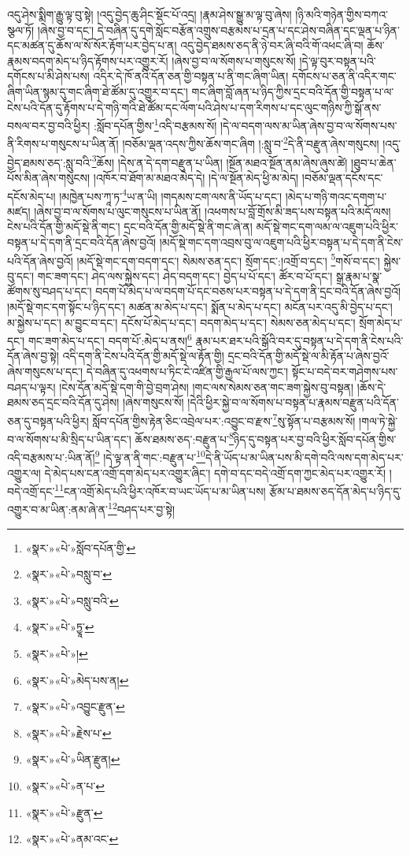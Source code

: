 འདུ་ཤེས་སྨིག་རྒྱུ་ལྟ་བུ་སྟེ། །འདུ་བྱེད་ཆུ་ཤིང་སྡོང་པོ་འདྲ། །རྣམ་ཤེས་སྒྱུ་མ་ལྟ་བུ་ཞེས། །ཉི་མའི་གཉེན་གྱིས་བཀའ་སྩལ་ཏོ། །ཞེས་བྱ་བ་དང་། དེ་བཞིན་དུ་དགེ་སློང་བརྩོན་འགྲུས་བརྩམས་པ་དྲན་པ་དང་ཤེས་བཞིན་དང་ལྡན་པ་ཉིན་དང་མཚན་དུ་ཆོས་ལ་སོ་སོར་རྟོག་པར་བྱེད་པ་ན། འདུ་བྱེད་ཐམས་ཅད་ནི་ཉེ་བར་ཞི་བའི་གོ་འཕང་ཞི་བ། ཆོས་རྣམས་བདག་མེད་པ་ཉིད་རྟོགས་པར་འགྱུར་རོ། །ཞེས་བྱ་བ་ལ་སོགས་པ་གསུངས་སོ། །དེ་ལྟ་བུར་བསྟན་པའི་དགོངས་པ་མི་ཤེས་པས། འདིར་དེ་ཁོ་ནའི་དོན་ཅན་གྱི་བསྟན་པ་ནི་གང་ཞིག་ཡིན། དགོངས་པ་ཅན་ནི་འདིར་གང་ཞིག་ཡིན་སྙམ་དུ་གང་ཞིག་ཐེ་ཚོམ་དུ་འགྱུར་བ་དང་། གང་ཞིག་བློ་ཞན་པ་ཉིད་ཀྱིས་དྲང་བའི་དོན་གྱི་བསྟན་པ་ལ་ངེས་པའི་དོན་དུ་རྟོགས་པ་དེ་གཉི་གའི་ཐེ་ཚོམ་དང་ལོག་པའི་ཤེས་པ་དག་རིགས་པ་དང་ལུང་གཉིས་ཀྱི་སྒོ་ནས་བསལ་བར་བྱ་བའི་ཕྱིར། :སློབ་དཔོན་གྱིས་\footnote{«སྣར་»«པེ་»སློབ་དཔོན་གྱི་}འདི་བརྩམས་སོ། །དེ་ལ་བདག་ལས་མ་ཡིན་ཞེས་བྱ་བ་ལ་སོགས་པས་ནི་རིགས་པ་གསུངས་པ་ཡིན་ནོ། །བཅོམ་ལྡན་འདས་ཀྱིས་ཆོས་གང་ཞིག །:སླུ་བ་\footnote{«སྣར་»«པེ་»བསླུ་བ་}དེ་ནི་བརྫུན་ཞེས་གསུངས། །འདུ་བྱེད་ཐམས་ཅད་:སླུ་བའི་\footnote{«སྣར་»«པེ་»བསླུ་བའི་}ཆོས། །དེས་ན་དེ་དག་བརྫུན་པ་ཡིན། །སྔོན་མཐའ་སྔོན་ནམ་ཞེས་ཞུས་ཚེ། །ཐུབ་པ་ཆེན་པོས་མིན་ཞེས་གསུངས། །འཁོར་བ་ཐོག་མ་མཐའ་མེད་དེ། །དེ་ལ་སྔོན་མེད་ཕྱི་མ་མེད། །བཅོམ་ལྡན་དངོས་དང་དངོས་མེད་པ། །མཁྱེན་པས་ཀཱ་ཏ་\footnote{«སྣར་»«པེ་»ཏྱཱ་}ཡ་ན་ཡི། །གདམས་ངག་ལས་ནི་ཡོད་པ་དང་། །མེད་པ་གཉི་གའང་དགག་པ་མཛད། །ཞེས་བྱ་བ་ལ་སོགས་པ་ལུང་གསུངས་པ་ཡིན་ནོ། །འཕགས་པ་བློ་གྲོས་མི་ཟད་པས་བསྟན་པའི་མདོ་ལས། ངེས་པའི་དོན་གྱི་མདོ་སྡེ་ནི་གང་། དྲང་བའི་དོན་གྱི་མདོ་སྡེ་ནི་གང་ཞེ་ན། མདོ་སྡེ་གང་དག་ལམ་ལ་འཇུག་པའི་ཕྱིར་བསྟན་པ་དེ་དག་ནི་དྲང་བའི་དོན་ཞེས་བྱའོ། །མདོ་སྡེ་གང་དག་འབྲས་བུ་ལ་འཇུག་པའི་ཕྱིར་བསྟན་པ་དེ་དག་ནི་ངེས་པའི་དོན་ཞེས་བྱའོ། །མདོ་སྡེ་གང་དག་བདག་དང་། སེམས་ཅན་དང་། སྲོག་དང་:།འགྲོ་བ་དང་། \footnote{«སྣར་»«པེ་»། }གསོ་བ་དང་། སྐྱེས་བུ་དང་། གང་ཟག་དང་། ཤེད་ལས་སྐྱེས་དང་། ཤེད་བདག་དང་། བྱེད་པ་པོ་དང་། ཚོར་བ་པོ་དང་། སྒྲ་རྣམ་པ་སྣ་ཚོགས་སུ་བཤད་པ་དང་། བདག་པོ་མེད་པ་ལ་བདག་པོ་དང་བཅས་པར་བསྟན་པ་དེ་དག་ནི་དྲང་བའི་དོན་ཞེས་བྱའོ། །མདོ་སྡེ་གང་དག་སྟོང་པ་ཉིད་དང་། མཚན་མ་མེད་པ་དང་། སྨོན་པ་མེད་པ་དང་། མངོན་པར་འདུ་མི་བྱེད་པ་དང་། མ་སྐྱེས་པ་དང་། མ་བྱུང་བ་དང་། དངོས་པོ་མེད་པ་དང་། བདག་མེད་པ་དང་། སེམས་ཅན་མེད་པ་དང་། སྲོག་མེད་པ་དང་། གང་ཟག་མེད་པ་དང་། བདག་པོ་:མེད་པ་ནས།\footnote{«སྣར་»«པེ་»མེད་པས་ན།} རྣམ་པར་ཐར་པའི་སྒོའི་བར་དུ་བསྟན་པ་དེ་དག་ནི་ངེས་པའི་དོན་ཞེས་བྱ་སྟེ། འདི་དག་ནི་ངེས་པའི་དོན་གྱི་མདོ་སྡེ་ལ་རྟོན་གྱི། དྲང་བའི་དོན་གྱི་མདོ་སྡེ་ལ་མི་རྟོན་པ་ཞེས་བྱའོ་ཞེས་གསུངས་པ་དང་། དེ་བཞིན་དུ་འཕགས་པ་ཏིང་ངེ་འཛིན་གྱི་རྒྱལ་པོ་ལས་ཀྱང་། སྟོང་པ་བདེ་བར་གཤེགས་པས་བཤད་པ་ལྟར། །ངེས་དོན་མདོ་སྡེ་དག་གི་བྱེ་བྲག་ཤེས། །གང་ལས་སེམས་ཅན་གང་ཟག་སྐྱེས་བུ་བསྟན། །ཆོས་དེ་ཐམས་ཅད་དྲང་བའི་དོན་དུ་ཤེས། །ཞེས་གསུངས་སོ། །དེའི་ཕྱིར་སྐྱེ་བ་ལ་སོགས་པ་བསྟན་པ་རྣམས་བརྫུན་པའི་དོན་ཅན་དུ་བསྟན་པའི་ཕྱིར། སློབ་དཔོན་གྱིས་རྟེན་ཅིང་འབྲེལ་པར་:འབྱུང་བ་རྫས་\footnote{«སྣར་»«པེ་»འབྱུང་རྫུན་}སུ་སྟོན་པ་བརྩམས་སོ། །གལ་ཏེ་སྐྱེ་བ་ལ་སོགས་པ་མི་སྲིད་པ་ཡིན་དང་། ཆོས་ཐམས་ཅད་:བརྫུན་པ་\footnote{«སྣར་»«པེ་»རྗེས་པ་}ཉིད་དུ་བསྟན་པར་བྱ་བའི་ཕྱིར་སློབ་དཔོན་གྱིས་འདི་བརྩམས་པ་:ཡིན་ནོ།\footnote{«སྣར་»«པེ་»ཡིན་རྫུན།} །དེ་ལྟ་ན་ནི་གང་:བརྫུན་པ་\footnote{«སྣར་»«པེ་»ན་པ་}དེ་ནི་ཡོད་པ་མ་ཡིན་པས་མི་དགེ་བའི་ལས་དག་མེད་པར་འགྱུར་ལ། དེ་མེད་པས་ངན་འགྲོ་དག་མེད་པར་འགྱུར་ཞིང་། དགེ་བ་དང་བདེ་འགྲོ་དག་ཀྱང་མེད་པར་འགྱུར་རོ། །བདེ་འགྲོ་དང་\footnote{«སྣར་»«པེ་»རྫུན་}ངན་འགྲོ་མེད་པའི་ཕྱིར་འཁོར་བ་ཡང་ཡོད་པ་མ་ཡིན་པས། རྩོམ་པ་ཐམས་ཅད་དོན་མེད་པ་ཉིད་དུ་འགྱུར་བ་མ་ཡིན་:ནམ་ཞེ་ན་\footnote{«སྣར་»«པེ་»ནམ་འང་}བཤད་པར་བྱ་སྟེ། 